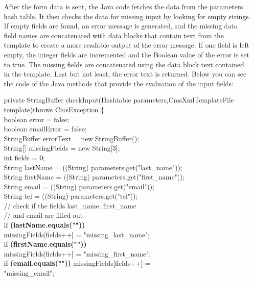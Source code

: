 After the form data is sent, the Java code fetches the data from the
parameters hash table. It then checks the data for missing input by looking for
empty strings. If empty fields are found, an error message is generated,
and the missing data field names are concatenated with data blocks that
contain text from the template to create a more readable output of the
error message. If one field is left empty, the integer fields are
incremented and the Boolean value of the error is set to true. The
missing fields are concatenated using the data block text contained in
the template. Last but not least, the error text is returned. Below you
can see the code of the Java methods that provide the evaluation of the
input fields:

\begin{java}
private StringBuffer checkInput(Hashtable parameters,CmsXmlTemplateFile template)throws CmsException \{\\
\jtabc        boolean error = false;\\
\jtabc        boolean emailError = false;\\
\jtabc        StringBuffer errorText = new StringBuffer();\\
\jtabc        String[] missingFields = new String[3];\\
\jtabc        int fields = 0;\\
\jtabc        String lastName = ((String) parameters.get("last\_name"));\\
\jtabc        String firstName = ((String) parameters.get("first\_name"));\\
\jtabc        String email = ((String) parameters.get("email"));\\
\jtabc        String tel = ((String) parameters.get("tel"));\\
\jtabc        // check if the fields last\_name, first\_name\\
\jtabd         // and email are filled out\\
\jtabc        if {\bf(lastName.equals(""))}\\
\jtabe                missingFields[fields++] = "missing\_last\_name";\\
\jtabc        if {\bf(firstName.equals(""))}\\
\jtabe                missingFields[fields++] = "missing\_first\_name";\\
\jtabe        if {\bf(email.equals(""))} missingFields[fields++] =\\
\jtabf         "missing\_email";\\

\end{java}
